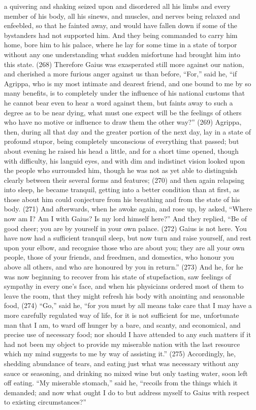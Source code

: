 a quivering and shaking seized upon and disordered all his limbs and every member of his body, all
his sinews, and muscles, and nerves being relaxed and enfeebled, so that he fainted away, and
would have fallen down if some of the bystanders had not supported him. And they being
commanded to carry him home, bore him to his palace, where he lay for some time in a state of
torpor without any one understanding what sudden misfortune had brought him into this state. (268)
Therefore Gaius was exasperated still more against our nation, and cherished a more furious
anger against us than before, ``For,'' said he, ``if Agrippa, who is my most intimate and dearest
friend, and one bound to me by so many benefits, is to completely under the influence of his
national customs that he cannot bear even to hear a word against them, but faints away to such a
degree as to be near dying, what must one expect will be the feelings of others who have no motive
or influence to draw them the other way?'' (269) Agrippa, then, during all that day and the greater
portion of the next day, lay in a state of profound stupor, being completely unconscious of
everything that passed; but about evening he raised his head a little, and for a short time opened,
though with difficulty, his languid eyes, and with dim and indistinct vision looked upon the people
who surrounded him, though he was not as yet able to distinguish clearly between their several
forms and features; (270) and then again relapsing into sleep, he became tranquil, getting into a
better condition than at first, as those about him could conjecture from his breathing and from the
state of his body. (271) And afterwards, when he awoke again, and rose up, by asked, ``Where
now am I? Am I with Gaius? Is my lord himself here?'' And they replied, ``Be of good cheer; you are
by yourself in your own palace. (272) Gaius is not here. You have now had a sufficient tranquil
sleep, but now turn and raise yourself, and rest upon your elbow, and recognise those who are
about you; they are all your own people, those of your friends, and freedmen, and domestics, who
honour you above all others, and who are honoured by you in return.'' (273) And he, for he was
now beginning to recover from his state of stupefaction, saw feelings of sympathy in every one's
face, and when his physicians ordered most of them to leave the room, that they might refresh his
body with anointing and seasonable food, (274) ``Go,'' said he, ``for you must by all means take
care that I may have a more carefully regulated way of life, for it is not sufficient for me,
unfortunate man that I am, to ward off hunger by a bare, and scanty, and economical, and precise
use of necessary food; nor should I have attended to any such matters if it had not been my object
to provide my miserable nation with the last resource which my mind suggests to me by way of
assisting it.'' (275) Accordingly, he, shedding abundance of tears, and eating just what was
necessary without any sauce or seasoning, and drinking no mixed wine but only tasting water, soon
left off eating. ``My miserable stomach,'' said he, ``recoils from the things which it demanded; and
now what ought I do to but address myself to Gaius with respect to existing circumstances?''


